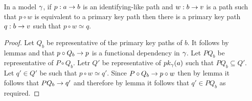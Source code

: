 \begin{lemma}
In a model $\gamma$, if $p:a \rightarrow b$ is an identifying-like path and $w:b \rightarrow v$ is a path such that $p \circ w$ is equivalent to a primary key path then
there is a primary key path $q:b \rightarrow v$ such that $p \circ w \simeq q$.
\end{lemma}
\begin{proof}
Let $Q_b$ be representative of the primary key paths of $b$. It follows by lemmas  and  that $p \circ Q_b \rightarrow p$ is a functional dependency in $\gamma$. 
Let $PQ_b$ be representative of $P \circ Q_b$. Letr $Q'$ be representative of $pk_{\gamma}(a)$ such that $PQ_b \subseteq Q'$. Let $q' \in Q'$ be such that $p \circ w \simeq q'$.
Since $P \circ Q_b \rightarrow p\circ w$ then by lemma  it follows that $PQ_b \rightarrow q'$ and therefore   
by lemma   it follows that $q' \in PQ_b$ as required.
\end{proof}
 


